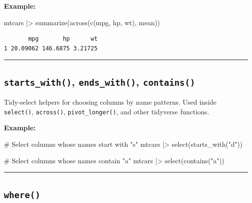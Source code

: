 \documentclass[
  letterpaper,
  DIV=11,
  numbers=noendperiod]{scrreprt}
\newenvironment{Shaded}{\begin{snugshade}}{\end{snugshade}}
\newcommand{\CommentTok}[1]{\textcolor[rgb]{0.37,0.37,0.37}{#1}}
\newcommand{\FunctionTok}[1]{\textcolor[rgb]{0.28,0.35,0.67}{#1}}
\newcommand{\NormalTok}[1]{\textcolor[rgb]{0.00,0.23,0.31}{#1}}
\newcommand{\SpecialCharTok}[1]{\textcolor[rgb]{0.37,0.37,0.37}{#1}}
\newcommand{\StringTok}[1]{\textcolor[rgb]{0.13,0.47,0.30}{#1}}
\begin{document}
\textbf{Example:}

\begin{Shaded}
\begin{Highlighting}[]
\NormalTok{mtcars }\SpecialCharTok{|\textgreater{}}
  \FunctionTok{summarize}\NormalTok{(}\FunctionTok{across}\NormalTok{(}\FunctionTok{c}\NormalTok{(mpg, hp, wt), mean))}
\end{Highlighting}
\end{Shaded}

\begin{verbatim}
       mpg       hp      wt
1 20.09062 146.6875 3.21725
\end{verbatim}

\begin{center}\rule{0.5\linewidth}{0.5pt}\end{center}

\subsection{\texorpdfstring{\texttt{starts\_with()},
\texttt{ends\_with()},
\texttt{contains()}}{starts\_with(), ends\_with(), contains()}}\label{starts_with-ends_with-contains}

Tidy-select helpers for choosing columns by name patterns. Used inside
\texttt{select()}, \texttt{across()}, \texttt{pivot\_longer()}, and
other tidyverse functions.

\textbf{Example:}

\begin{Shaded}
\begin{Highlighting}[]
\CommentTok{\# Select columns whose names start with "s"}
\NormalTok{mtcars }\SpecialCharTok{|\textgreater{}} \FunctionTok{select}\NormalTok{(}\FunctionTok{starts\_with}\NormalTok{(}\StringTok{"d"}\NormalTok{))}

\CommentTok{\# Select columns whose names contain "a"}
\NormalTok{mtcars }\SpecialCharTok{|\textgreater{}} \FunctionTok{select}\NormalTok{(}\FunctionTok{contains}\NormalTok{(}\StringTok{"a"}\NormalTok{))}
\end{Highlighting}
\end{Shaded}

\begin{center}\rule{0.5\linewidth}{0.5pt}\end{center}

\subsection{\texorpdfstring{\texttt{where()}}{where()}}\label{where}
\end{document}

